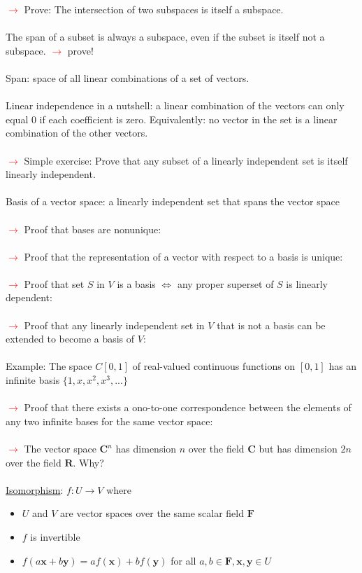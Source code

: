 \documentclass[a4paper]{article}
\newcommand{\x}{\textbf{x}}
\newcommand{\y}{\textbf{y}}
\newcommand{\F}{\textbf{F}}
\newcommand{\R}{\textbf{R}}
\newcommand{\C}{\textbf{C}}
\newcommand{\att}{\textcolor{red}{$\rightarrow$ }}
\begin{document}
\att Prove: The intersection of two subspaces is itself a subspace.\\~\\
The span of a subset is always a subspace, even if the subset is itself not a subspace. \att prove! \\~\\
Span: space of all linear combinations of a set of vectors.\\~\\
Linear independence in a nutshell: a linear combination of the vectors can only equal 0 if each coefficient is zero. Equivalently: no vector in the set is a linear combination of the other vectors.\\~\\
\att Simple exercise: Prove that any subset of a linearly independent set is itself linearly independent.\\~\\
Basis of a vector space: a linearly independent set that spans the vector space\\~\\
\att Proof that bases are nonunique: \\~\\
\att Proof that the representation of a vector with respect to a basis is unique: \\~\\
\att Proof that set $S$ in $V$ is a basis $\iff$ any proper superset of $S$ is linearly dependent: \\~\\
\att Proof that any linearly independent set in $V$ that is not a basis can be extended to become a basis of $V$: \\~\\
Example: The space $C[0,1]$ of real-valued continuous functions on $[0,1]$ has an infinite basis $\{1,x,x^2,x^3,...\}$ \\~\\
\att Proof that there exists a ono-to-one correspondence between the elements of any two infinite bases for the same vector space: \\~\\
\att The vector space $\C^n$ has dimension $n$ over the field $\C$ but has dimension $2n$ over the field $\R$. Why?\\~\\
\underline{Isomorphism}: $f:U \rightarrow V$ where
\begin{itemize}
 \item $U$ and $V$ are vector spaces over the same scalar field $\F$
 \item $f$ is invertible
 \item $f(a\x+b\y) = af(\x)+bf(\y)$ for all $a,b \in \F, \x,\y \in U$
\end{itemize}
\end{document}
